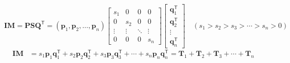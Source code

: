 \documentclass[a1paper,portrait,margin=0.8cm]{baposter}
\begin{document}
\begin{poster}
{\begin{minipage}[b]{0.65\textwidth}
\[
\boldsymbol{IM}\!
= \!\boldsymbol{PSQ}^\mathsf{T} \!
= (\boldsymbol{p}_1, \boldsymbol{p}_2, \ldots, \boldsymbol{p}_n)
\!\begin{bmatrix} \!
s_1 & 0 & 0 & 0 \\ 
0 & s_2 & 0 & 0 \\[-5pt]
\vdots & \vdots & \ddots & \vdots \\
0 & 0 & 0 & s_n 
\!\!\end{bmatrix}\!\!
\!\!\begin{bmatrix}
\boldsymbol{q}_1^\mathsf{T} \\[1pt]
\boldsymbol{q}_2^\mathsf{T} \\[-5pt] 
\vdots \\ 
\boldsymbol{q}_n^\mathsf{T} \!\!
\end{bmatrix}\!\!\!\!\!\!
\quad (s_1 \!\!>\!\! s_2 \!\!>\!\! s_3 \!\!>\!\! \cdots\!\! > \!\!s_n \!\!>\!\! 0)\!
\]
\vspace{-2em}
\[
\begin{aligned}
\boldsymbol{IM} \!
&= \!{s_1 \boldsymbol{p}_1 \boldsymbol{q}_1^\mathsf{T} 
\!+ \!s_2 \boldsymbol{p}_2 \boldsymbol{q}_2^\mathsf{T} 
\!+ \!s_3 \boldsymbol{p}_3 \boldsymbol{q}_3^\mathsf{T} 
\!+ \cdots +\! s_n \boldsymbol{p}_n \boldsymbol{q}_n^\mathsf{T}}_{\text{}}
\! = \!\boldsymbol{T}_1 \!+\! \boldsymbol{T}_2\! +\! \boldsymbol{T}_3 \!+ \cdots + \!\boldsymbol{T}_n
\end{aligned}
\]
\end{minipage}



}


\end{poster}
\end{document}
